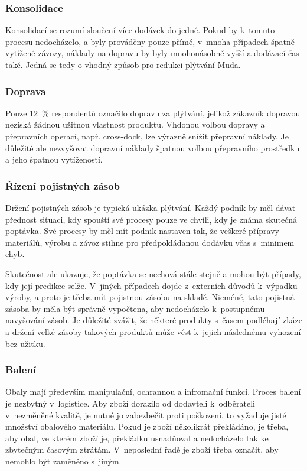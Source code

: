 \subsubsection*{Konsolidace}

Konsolidací se rozumí sloučení více dodávek do jedné. Pokud by k~tomuto procesu nedocházelo, a byly prováděny pouze přímé, v~mnoha případech špatně vytížené závozy, náklady na dopravu by byly mnohonásobně vyšší a dodávací čas také. Jedná se tedy o vhodný způsob pro redukci plýtvání Muda.


\subsubsection*{Doprava}

Pouze 12~\% respondentů označilo dopravu za plýtvání, jelikož zákazník dopravou nezíská žádnou užitnou vlastnost produktu. Vhdonou volbou dopravy a přepravních operací, např. cross-dock, lze výrazně snížit přepravní náklady. Je důležité ale nezvyšovat dopravní náklady špatnou volbou přepravního prostředku a jeho špatnou vytížeností.

\subsubsection*{Řízení pojistných zásob}

Držení pojistných zásob je typická ukázka plýtvání. Každý podník by měl dávat přednost situaci, kdy spouští své procesy pouze ve chvíli, kdy je známa skutečná poptávka. Své procesy by měl mít podnik nastaven tak, že veškeré přípravy materiálů, výrobu a závoz stihne pro předpokládanou dodávku včas s~minimem chyb.

Skutečnost ale ukazuje, že poptávka se nechová stále stejně a mohou být případy, kdy její predikce selže. V~jiných případech dojde z~externích důvodů k~výpadku výroby, a proto je třeba mít pojistnou zásobu na skladě. Nicméně, tato pojistná zásoba by měla být správně vypočtena, aby nedocházelo k~postupnému navyšování zásob. Je důležité zvážit, že některé produkty s~časem podléhají zkáze a držení velké zásoby takových produktů může vést k~jejich následnému vyhození bez užitku.

\subsubsection*{Balení}

Obaly mají především manipulační, ochrannou a infromační funkci. Proces balení je nezbytný v~logistice. Aby zboží dorazilo od dodavteli k~odběrateli v~nezměněné kvalitě, je nutné jo zabezbečit proti poškození, to vyžaduje jisté množství obalového materiálu. Pokud je zboží několikrát překládáno, je třeba, aby obal, ve kterém zboží je, překládku usnadňoval a nedocházelo tak ke zbytečným časovým ztrátám. V~neposlední řadě je zboží třeba označit, aby nemohlo být zaměněno s~jiným.

